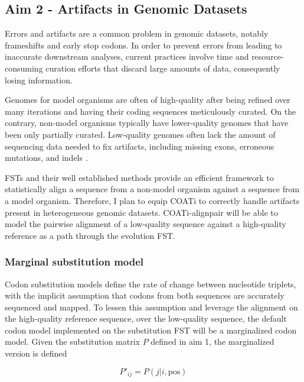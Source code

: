 \subsection{Aim 2 - Artifacts in Genomic Datasets}

Errors and artifacts are a common problem in genomic datasets, notably
frameshifts and early stop codons.
In order to prevent errors from leading to inaccurate downstream analyses,
current practices involve time and resource-consuming curation efforts that
discard large amounts of data, consequently losing information.

Genomes for model organisms are often of high-quality after being refined over
many iterations and having their coding sequences meticulously curated.
On the contrary, non-model organisms typically have lower-quality genomes that
have been only partially curated.
Low-quality genomes often lack the amount of sequencing data needed to fix
artifacts, including missing exons, erroneous mutations, and indels
\parencite{jackman2018tigmint}.

FSTs and their well established methods provide an efficient framework to
statistically align a sequence from a non-model organism against a sequence from
a model organism.
Therefore, I plan to equip COATi to correctly handle artifacts present in
heterogeneous genomic datasets.
COATi-alignpair will be able to model the pairwise alignment of a low-quality
sequence against a high-quality reference as a path through the evolution FST.

\subsubsection{Marginal substitution model}


Codon substitution models define the rate of change between nucleotide triplets,
with the implicit assumption that codons from both sequences are accurately
sequenced and mapped.
To lessen this assumption and leverage the alignment on the high-quality
reference sequence, over the low-quality sequence, the default codon model
implemented on the substitution FST will be a marginalized codon model.
Given the substitution matrix $P$ defined in aim 1, the marginalized version is
defined

\[ P'_{ij} = P(j | i, \text{pos}) \]

